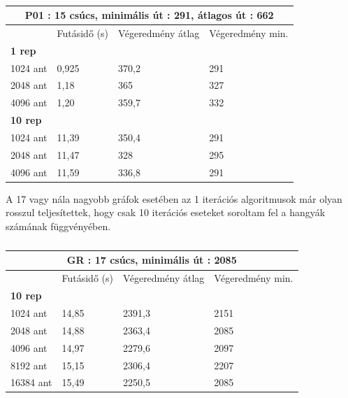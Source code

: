 \begin{table}[ht!]
	\centering
	\begin{tabular}{|p{2cm}||p{3cm}|p{3.5cm}|p{3.5cm}|}
		\hline
		\multicolumn{4}{|c|}{P01 : 15 csúcs, minimális út : 291, átlagos út : 662} \\
		\hline
		& Futásidő (s) & Végeredmény átlag & Végeredmény min.\\
		\hline
		\textbf{1 rep} & & &\\
		1024 ant & 0,925 & 370,2 & 291\\
		2048 ant & 1,18 & 365 & 327\\
		4096 ant & 1,20 & 359,7 & 332\\
		\hline
		\textbf{10 rep} & & &\\
		1024 ant & 11,39 & 350,4 & 291\\
		2048 ant & 11,47 & 328 & 295\\
		4096 ant & 11,59 & 336,8 & 291\\
		\hline
	\end{tabular}
	\caption{}
	\label{table:TSPv1_15}
\end{table}

A 17 vagy nála nagyobb gráfok esetében az 1 iterációs algoritmusok már olyan rosszul teljesítettek, hogy csak 10 iterációs eseteket soroltam fel a hangyák számának függvényében.

\begin{table}[ht!]
	\centering
	\begin{tabular}{|p{2cm}||p{3cm}|p{3.5cm}|p{3.5cm}|}
		\hline
		\multicolumn{4}{|c|}{GR : 17 csúcs, minimális út : 2085} \\
		\hline
		& Futásidő (s) & Végeredmény átlag & Végeredmény min.\\
		\hline
		\textbf{10 rep} & & & \\
		1024 ant & 14,85 & 2391,3 & 2151\\
		2048 ant & 14,88 & 2363,4 & 2085\\
		4096 ant & 14,97 & 2279,6 & 2097\\
		8192 ant & 15,15 & 2306,4 & 2207\\
		16384 ant & 15,49 & 2250,5 & 2085\\
		\hline
	\end{tabular}
	\caption{}
	\label{table:TSPv1_17}
\end{table}

